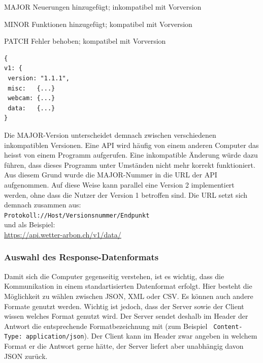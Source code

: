 \begin{description*}
  \item[MAJOR] Neuerungen hinzugefügt; inkompatibel mit Vorversion
  \item[MINOR] Funktionen hinzugefügt; kompatibel mit Vorversion
  \item[PATCH] Fehler behoben; kompatibel mit Vorversion
\end{description*}

\vspace{3mm}
\begin{lstlisting}[label=lst:versionierung,caption=Versionierungsangabe auf der obersten Hierarchiestufe, language=HTML5, style=php]
{
v1: {
 version: "1.1.1",
 misc:   {...}
 webcam: {...}
 data:   {...}
}
\end{lstlisting}
\vspace{3mm}

\noindent
Die MAJOR-Version unterscheidet demnach zwischen verschiedenen inkompatiblen Versionen. Eine API wird häufig von einem anderen Computer das heisst von einem Programm aufgerufen. Eine inkompatible Änderung würde dazu führen, dass dieses Programm unter Umständen nicht mehr korrekt funktioniert. Aus diesem Grund wurde die MAJOR-Nummer in die URL der API aufgenommen. Auf diese Weise kann parallel eine Version 2 implementiert werden, ohne dass die Nutzer der Version 1 betroffen sind. Die URL setzt sich demnach zusammen aus: \\

\noindent
\texttt{Protokoll://Host/Versionsnummer/Endpunkt}\\
und als Beispiel:\\
\url{https://api.wetter-arbon.ch/v1/data/}

\noindent
{}


\subsubsection{Auswahl des Response-Datenformats}
Damit sich die Computer gegenseitig verstehen, ist es wichtig, dass die Kommunikation in einem standartisierten Datenformat erfolgt. Hier besteht die Möglichkeit zu wählen zwischen JSON, XML oder CSV. Es können auch andere Formate genutzt werden. Wichtig ist jedoch, dass der Server sowie der Client wissen welches Format genutzt wird. Der Server sendet deshalb im Header der Antwort die entsprechende Formatbezeichnung mit (zum Beispiel \texttt{ Content-Type: application/json}). Der Client kann im Header zwar angeben in welchem Format er die Antwort gerne hätte, der Server liefert aber unabhängig davon JSON zurück.

